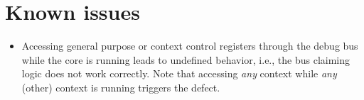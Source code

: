 \documentclass[10pt]{article}
\begin{document}
\clearpage
\section{Known issues}

\begin{itemize}
  
  \item Accessing general purpose or context control registers through the debug bus while the core is running leads to undefined behavior, i.e., the bus claiming logic does not work correctly. Note that accessing \textit{any} context while \textit{any} (other) context is running triggers the defect.
  
\end{itemize}
\end{document}
